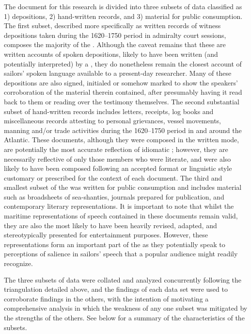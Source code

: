 The document  for this research is divided into three subsets of data classified as 1) depositions, 2) hand-written records, and 3) material for public consumption. The first subset, described more specifically as written records of witness depositions taken during the 1620–1750 period in admiralty court sessions, composes the majority of the . Although the caveat remains that these are written accounts of spoken depositions, likely to have been written (and potentially interpreted) by a , they do nonetheless remain the closest account of sailors’ spoken language available to a present-day researcher. Many of these depositions are also signed, initialed or somehow marked to show the speakers’ corroboration of the material therein contained, after presumably having it read back to them or reading over the testimony themselves. The second substantial subset of hand-written records includes letters, receipts, log books and miscellaneous records attesting to personal grievances, vessel movements, manning and/or trade activities during the 1620–1750 period in and around the Atlantic. These documents, although they were composed in the written mode, are potentially the most accurate reflection of idiomatic ; however, they are necessarily reflective of only those  members who were literate, and were also likely to have been composed following an accepted format or linguistic style customary or prescribed for the context of each document. The third and smallest subset of the  was written for public consumption and includes material such as broadsheets of sea-shanties, journals prepared for publication, and contemporary literary representations. It is important to note that whilst the maritime representations of speech contained in these documents remain valid, they are also the most likely to have been heavily revised, adapted, and stereotypically presented for entertainment purposes. However, these representations form an important part of the  as they potentially speak to perceptions of salience in sailors’ speech that a popular audience might readily recognize. 



The three subsets of data were collated and analyzed concurrently following the triangulation  detailed above, and the findings of each data set were used to corroborate findings in the others, with the intention of motivating a comprehensive analysis in which the weakness of any one subset was mitigated by the strengths of the others. See  below for a summary of the characteristics of the  subsets. 





